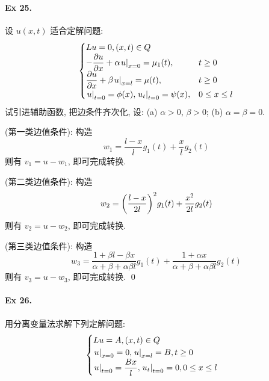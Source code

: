 \paragraph{Ex 25.}
设 $u(x, t)$ 适合定解问题:
\[ \begin{cases}
Lu = 0, (x, t) \in Q \\
-{\dfrac{\partial {u}}{\partial {x}}} + \alpha {\left.{u} \right|}_{x=0} = \mu_1(t), & t \geq 0 \\
{\dfrac{\partial {u}}{\partial {x}}} + \beta {\left.{u} \right|}_{x=l} = \mu(t), & t \geq 0 \\
{\left.{u} \right|}_{t=0} = \phi(x), {\left.{u_t} \right|}_{t=0} = \psi(x), & 0 \leq x \leq l
\end{cases} \]
试引进辅助函数, 把边条件齐次化, 设: (a) $\alpha > 0$, $\beta > 0$; (b)
$\alpha = \beta = 0$.

\begin{solution}
\noindent (第一类边值条件): 构造
\[w_1 = \frac{l-x}{l}g_1(t) + \frac xl g_2(t)\]
则有 $v_1 = u - w_1$, 即可完成转换.

\noindent (第二类边值条件): 构造
\[w_2 = {\left( {\frac{l-x}{2l}} \right)}^2 g_1(t) + \frac{x^2}{2l} g_2(t)\]
则有 $v_2 = u - w_2$, 即可完成转换.

\noindent (第三类边值条件): 构造
\[
w_3 = \frac{1 + \beta l- \beta x}{\alpha + \beta + \alpha\beta l} g_1(t)
+ \frac{1 + \alpha x}{\alpha + \beta + \alpha\beta l} g_2(t)
\]
则有 $v_3 = u - w_3$, 即可完成转换.
\qed
\end{solution}
\paragraph{Ex 26.}
用分离变量法求解下列定解问题:
\[ \begin{cases}
Lu = A, (x, t) \in Q \\
{\left.{u} \right|}_{x=0} = 0, {\left.{u} \right|}_{x=l} = B, t \geq 0 \\
{\left.{u} \right|}_{t=0} = \dfrac{Bx}{l}, {\left.{u_t} \right|}_{t=0} = 0, 0 \leq x \leq l
\end{cases} \]

